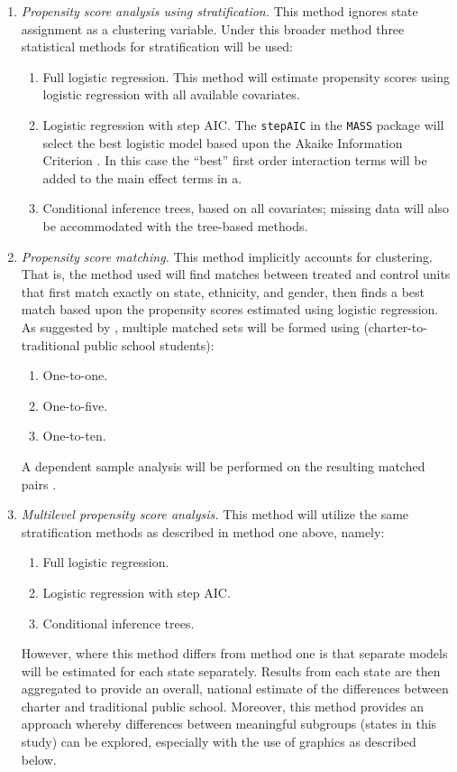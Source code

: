 \documentclass[man,floatsintext]{apa6}
\begin{document}
\begin{enumerate}
	\item \textit{Propensity score analysis using stratification.} This method ignores state assignment as a clustering variable. Under this broader method three statistical methods for stratification will be used:
		\begin{enumerate}
			\item Full logistic regression. This method will estimate propensity scores using logistic regression with all available covariates.
			\item Logistic regression with step AIC. The \texttt{stepAIC} in the \texttt{MASS} package \parencite{mass} will select the best logistic model based upon the Akaike Information Criterion \parencite{Akaike1974}. In this case the ``best'' first order interaction terms will be added to the main effect terms in a.
			\item Conditional inference trees, based on all covariates; missing data will also be accommodated with the tree-based methods.
		\end{enumerate}
	\item \textit{Propensity score matching.} This method implicitly accounts for clustering. That is, the method used will find matches between treated and control units that first match exactly on state, ethnicity, and gender, then finds a best match based upon the propensity scores estimated using logistic regression. As suggested by \textcite{Stuart2010}, multiple matched sets will be formed using (charter-to-traditional public school students):
		\begin{enumerate}
			\item One-to-one.
			\item One-to-five.
			\item One-to-ten.
		\end{enumerate}
		A dependent sample analysis will be performed on the resulting matched pairs \parencite{Austin2011}.
	\item \textit{Multilevel propensity score analysis.} This method will utilize the same stratification methods as described in method one above, namely:
		\begin{enumerate}
			\item Full logistic regression.
			\item Logistic regression with step AIC.
			\item Conditional inference trees.
		\end{enumerate}
	However, where this method differs from method one is that separate models will be estimated for each state separately. Results from each state are then aggregated to provide an overall, national estimate of the differences between charter and traditional public school. Moreover, this method provides an approach whereby differences between meaningful subgroups (states in this study) can be explored, especially with the use of graphics as described below.
\end{enumerate}
\end{document}
